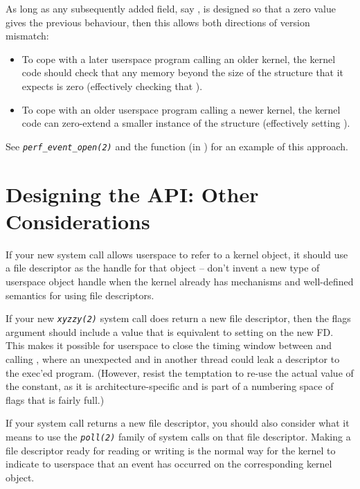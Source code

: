 \documentclass[a4paper,8pt,english]{sphinxmanual}
\begin{document}
As long as any subsequently added field, say , is designed so that a
zero value gives the previous behaviour, then this allows both directions of
version mismatch:
\begin{itemize}
\item {} 
To cope with a later userspace program calling an older kernel, the kernel
code should check that any memory beyond the size of the structure that it
expects is zero (effectively checking that ).

\item {} 
To cope with an older userspace program calling a newer kernel, the kernel
code can zero-extend a smaller instance of the structure (effectively
setting ).

\end{itemize}

See \emph{\texttt{perf\_event\_open(2)}} and the  function (in
) for an example of this approach.


\section{Designing the API: Other Considerations}
\label{process/adding-syscalls:designing-the-api-other-considerations}
If your new system call allows userspace to refer to a kernel object, it
should use a file descriptor as the handle for that object -- don't invent a
new type of userspace object handle when the kernel already has mechanisms and
well-defined semantics for using file descriptors.

If your new \emph{\texttt{xyzzy(2)}} system call does return a new file descriptor,
then the flags argument should include a value that is equivalent to setting
 on the new FD.  This makes it possible for userspace to close
the timing window between  and calling
, where an unexpected  and
 in another thread could leak a descriptor to
the exec'ed program. (However, resist the temptation to re-use the actual value
of the  constant, as it is architecture-specific and is part of a
numbering space of  flags that is fairly full.)

If your system call returns a new file descriptor, you should also consider
what it means to use the \emph{\texttt{poll(2)}} family of system calls on that file
descriptor. Making a file descriptor ready for reading or writing is the
normal way for the kernel to indicate to userspace that an event has
occurred on the corresponding kernel object.
\end{document}
